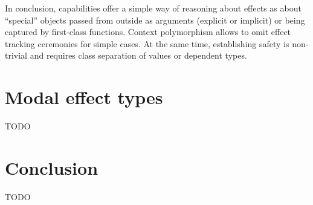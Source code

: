 \documentclass[conference]{IEEEtran}
\begin{document}
    In conclusion, capabilities offer a simple way of reasoning about effects as about ``special'' objects passed from outside as arguments (explicit or implicit) or being captured by first-class functions.
    Context polymorphism allows to omit effect tracking ceremonies for simple cases.
    At the same time, establishing safety is non-trivial and requires class separation of values or dependent types.


    \section{Modal effect types} \label{sec:modal}



    TODO \cite{convent2020doo}\cite{tang2024modal}




    \section{Conclusion}

    TODO %


%



    
    
\end{document}
